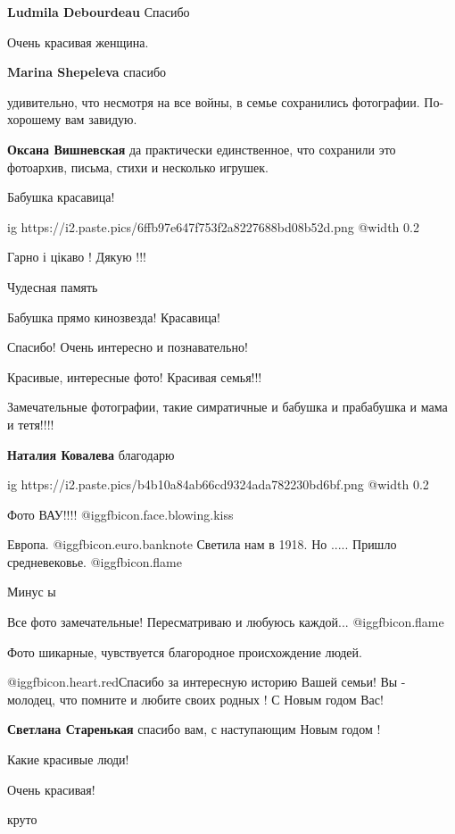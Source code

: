 \begin{itemize}
\begin{itemize}
\textbf{Ludmila Debourdeau} Спасибо

\end{itemize} %

Очень красивая женщина.

\textbf{Marina Shepeleva} спасибо

удивительно, что несмотря на все войны, в семье сохранились фотографии. По-хорошему вам завидую.

\textbf{Оксана Вишневская} да практически единственное, что сохранили это фотоархив, письма, стихи и несколько игрушек.

Бабушка красавица!

\ifcmt
  ig https://i2.paste.pics/6ffb97e647f753f2a8227688bd08b52d.png
  @width 0.2
\fi

Гарно і цікаво ! Дякую !!!

Чудесная память

Бабушка прямо кинозвезда! Красавица!

Спасибо! Очень интересно и познавательно!

Красивые, интересные фото! Красивая семья!!!

Замечательные фотографии, такие симратичные и бабушка и прабабушка и мама и тетя!!!!

\textbf{Наталия Ковалева} благодарю


\ifcmt
  ig https://i2.paste.pics/b4b10a84ab66cd9324ada782230bd6bf.png
  @width 0.2
\fi

Фото ВАУ!!!!  @igg{fbicon.face.blowing.kiss} 

Европа.  @igg{fbicon.euro.banknote}  Светила нам в 1918. Но ..... Пришло
средневековье.  @igg{fbicon.flame} 

Минус ы

Все фото замечательные! Пересматриваю и любуюсь каждой... @igg{fbicon.flame} 

Фото шикарные, чувствуется благородное происхождение людей.


@igg{fbicon.heart.red}Спасибо за интересную историю Вашей семьи! Вы - молодец,
что помните и любите своих родных ! С Новым годом Вас!

\textbf{Светлана Старенькая} спасибо вам, с наступающим Новым годом !

Какие красивые люди!

Очень красивая!

круто

\end{itemize} %
